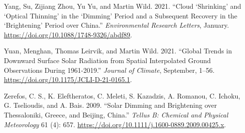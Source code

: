\documentclass[
  preprint, 3p, authoryear]{article}
\newlength{\cslhangindent}
\newlength{\cslentryspacingunit} %
\newenvironment{CSLReferences}[2] %
 {%
  \setlength{\parindent}{0pt}
  \ifodd #1
  \let\oldpar\par
  \def\par{\hangindent=\cslhangindent\oldpar}
  \fi
  \setlength{\parskip}{#2\cslentryspacingunit}
 }%
 {}
\begin{document}
\begin{CSLReferences}{1}{0}
\leavevmode{}%
Yang, Su, Zijiang Zhou, Yu Yu, and Martin Wild. 2021. {``Cloud {`Shrinking'} and {`Optical Thinning'} in the {`Dimming'} Period and a Subsequent Recovery in the {`Brightening'} Period over China.''} \emph{Environmental Research Letters}, January. \url{https://doi.org/10.1088/1748-9326/abdf89}.

\leavevmode{}%
Yuan, Menghan, Thomas Leirvik, and Martin Wild. 2021. {``Global Trends in Downward Surface Solar Radiation from Spatial Interpolated Ground Observations During 1961-2019.''} \emph{Journal of Climate}, September, 1--56. \url{https://doi.org/10.1175/JCLI-D-21-0165.1}.

\leavevmode{}%
Zerefos, C. S., K. Eleftheratos, C. Meleti, S. Kazadzis, A. Romanou, C. Ichoku, G. Tselioudis, and A. Bais. 2009. {``Solar Dimming and Brightening over Thessaloniki, Greece, and Beijing, China.''} \emph{Tellus B: Chemical and Physical Meteorology} 61 (4): 657. \url{https://doi.org/10.1111/j.1600-0889.2009.00425.x}.

\end{CSLReferences}
\end{document}
